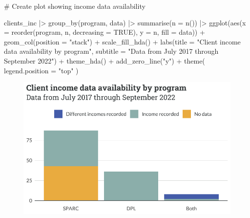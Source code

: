 \documentclass[
  letterpaper,
  DIV=11,
  numbers=noendperiod]{scrartcl}
\newenvironment{Shaded}{\begin{snugshade}}{\end{snugshade}}
\newcommand{\AttributeTok}[1]{\textcolor[rgb]{0.40,0.45,0.13}{#1}}
\newcommand{\CommentTok}[1]{\textcolor[rgb]{0.37,0.37,0.37}{#1}}
\newcommand{\ConstantTok}[1]{\textcolor[rgb]{0.56,0.35,0.01}{#1}}
\newcommand{\FunctionTok}[1]{\textcolor[rgb]{0.28,0.35,0.67}{#1}}
\newcommand{\NormalTok}[1]{\textcolor[rgb]{0.00,0.23,0.31}{#1}}
\newcommand{\SpecialCharTok}[1]{\textcolor[rgb]{0.37,0.37,0.37}{#1}}
\newcommand{\StringTok}[1]{\textcolor[rgb]{0.13,0.47,0.30}{#1}}
\begin{document}
\begin{Shaded}
\begin{Highlighting}[]
\CommentTok{\# Create plot showing income data availability}

\NormalTok{clients\_inc }\SpecialCharTok{|\textgreater{}} 
  \FunctionTok{group\_by}\NormalTok{(program, data) }\SpecialCharTok{|\textgreater{}} 
  \FunctionTok{summarise}\NormalTok{(}\AttributeTok{n =} \FunctionTok{n}\NormalTok{()) }\SpecialCharTok{|\textgreater{}} 
  \FunctionTok{ggplot}\NormalTok{(}\FunctionTok{aes}\NormalTok{(}\AttributeTok{x =} \FunctionTok{reorder}\NormalTok{(program, n, }\AttributeTok{decreasing =} \ConstantTok{TRUE}\NormalTok{), }\AttributeTok{y =}\NormalTok{ n, }\AttributeTok{fill =}\NormalTok{ data)) }\SpecialCharTok{+}
    \FunctionTok{geom\_col}\NormalTok{(}\AttributeTok{position =} \StringTok{"stack"}\NormalTok{) }\SpecialCharTok{+}
    \FunctionTok{scale\_fill\_hda}\NormalTok{() }\SpecialCharTok{+}
    \FunctionTok{labs}\NormalTok{(}\AttributeTok{title =} \StringTok{"Client income data availability by program"}\NormalTok{,}
         \AttributeTok{subtitle =} \StringTok{"Data from July 2017 through September 2022"}\NormalTok{) }\SpecialCharTok{+}
    \FunctionTok{theme\_hda}\NormalTok{() }\SpecialCharTok{+}
    \FunctionTok{add\_zero\_line}\NormalTok{(}\StringTok{"y"}\NormalTok{) }\SpecialCharTok{+}
    \FunctionTok{theme}\NormalTok{(}
      \AttributeTok{legend.position =} \StringTok{"top"}
\NormalTok{    )}
\end{Highlighting}
\end{Shaded}

\begin{figure}[H]

{\centering \includegraphics{piedmont_files/figure-pdf/income-data-1.pdf}

}

\end{figure}
\end{document}
